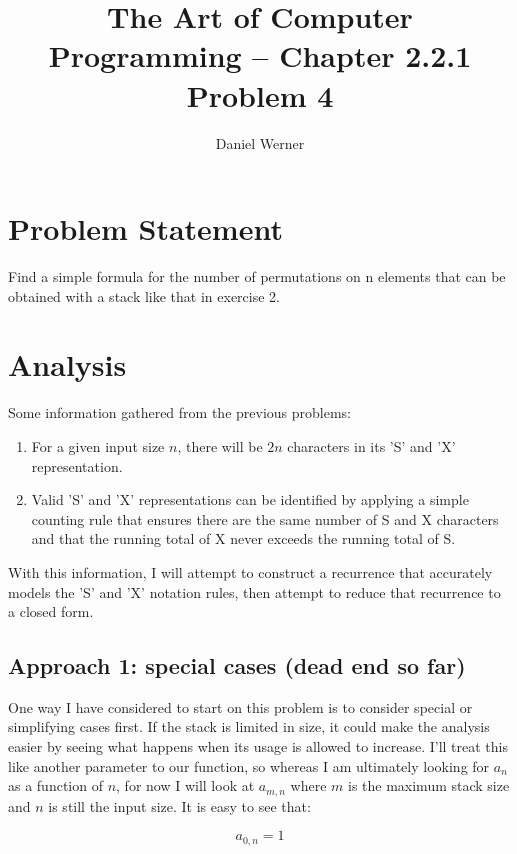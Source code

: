 \documentclass{article}
\title{The Art of Computer Programming -- Chapter 2.2.1 Problem 4}
\author{Daniel Werner}
\begin{document}
\maketitle

\section*{
    Problem Statement
}

Find a simple formula for the number of permutations on n elements that can be obtained with a stack like that in exercise 2.

\section*{
    Analysis
}

Some information gathered from the previous problems:
\begin{enumerate}
  \item For a given input size $n$, there will be $2n$ characters in its 'S' and 'X' representation.
  \item Valid 'S' and 'X' representations can be identified by applying a simple counting rule that ensures there are the same number of S and X characters and that the running total of X never exceeds the running total of S.
\end{enumerate}

With this information, I will attempt to construct a recurrence that accurately models the 'S' and 'X' notation rules, then attempt to reduce that recurrence to a closed form.

\subsection*{Approach 1: special cases (dead end so far)}

One way I have considered to start on this problem is to consider special or simplifying cases first.  If the stack is limited in size, it could make the analysis easier by seeing what happens when its usage is allowed to increase.  I'll treat this like another parameter to our function, so whereas I am ultimately looking for $a_n$ as a function of $n$, for now I will look at $a_{m,n}$ where $m$ is the maximum stack size and $n$ is still the input size.  It is easy to see that:

\begin{equation*}
  a_{0,n} = 1
\end{equation*}
\end{document}
